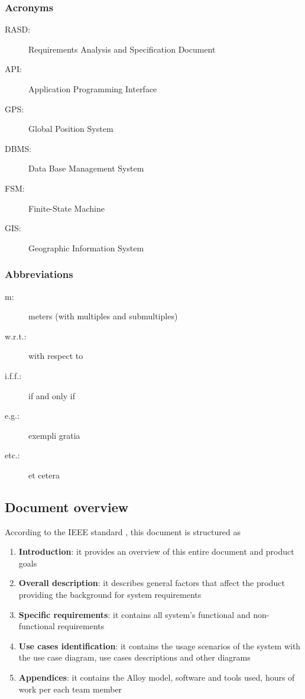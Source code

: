 \subsubsection{Acronyms}
	\begin{description}
		\item [RASD:] Requirements Analysis and Specification Document
		\item [API:] Application Programming Interface
		\item [GPS:] Global Position System
		\item [DBMS:] Data Base Management System
		\item [FSM:] Finite-State Machine
		\item [GIS:] Geographic Information System
		
	\end{description}
\subsubsection{Abbreviations}
	\begin{description}
		\item [m:] meters (with multiples and submultiples)
		\item [w.r.t.:] with respect to
		\item [i.f.f.:] if and only if
		\item [e.g.:] exempli gratia
		\item [etc.:] et cetera
	\end{description}

\subsection{Document overview}
According to the IEEE standard \cite{IeeeRasd}, this document is structured as
\begin{enumerate}
	\item \textbf{Introduction}: it provides an overview of this entire document and product goals
	\item \textbf{Overall description}: it describes general factors that affect the product providing the background for system requirements
	\item \textbf{Specific requirements}: it contains all system's functional and non-functional requirements
	\item \textbf{Use cases identification}: it contains the usage scenarios of the system with the use case diagram, use cases descriptions and other diagrams
	\item \textbf{Appendices}: it contains the Alloy model, software and tools used, hours of work per each team member
\end{enumerate}